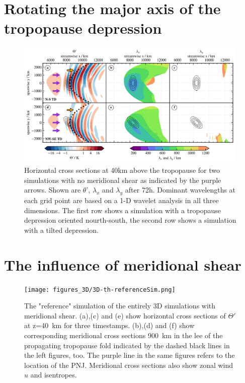 \section{Rotating the major axis of the tropopause depression}
\begin{figure}[tbp]
    \centering
    \includegraphics[width=0.99\textwidth]{figures_3D/waveletAna_overview_noShear.png}
    \caption{Horizontal cross sections at 40km above the tropopause for two simulations with no meridional shear as indicated by the purple arrows. Shown are $\theta$', $\lambda_x$ and $\lambda_y$ after 72h. Dominant wavelengths at each grid point are based on a 1-D wavelet analysis in all three dimensions. The first row shows a simulation with a tropopause depression oriented nourth-south, the second row shows a simulation with a tilted depression.}
    \label{fig:waveletAna_noShear}
\end{figure}



\section{The influence of meridional shear}
\begin{figure}[tbp]
    \centering
    \texttt{[image: figures\_3D/3D-th-referenceSim.png]}
    \caption{The "reference" simulation of the entirely 3D simulations with meridional shear. (a),(c) and (e) show horizontal cross sections of $\Theta'$ at z=\SI{40}{\kilo\meter} for three timestamps. (b),(d) and (f) show corresponding meridional cross sections \SI{900}{\kilo\meter} in the lee of the propagating tropopause fold indicated by the dashed black lines in the left figures, too. The purple line in the same figures refers to the location of the PNJ. Meridional cross sections also show zonal wind $u$ and isentropes.}
    \label{fig:3D-reference}
\end{figure}


